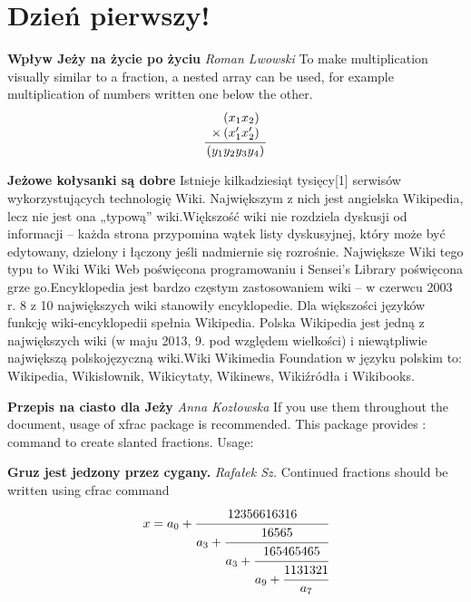 \documentclass{article}
\begin{document}
\section{Dzień pierwszy!}
                
\par \textbf{Wpływ Jeży na życie po życiu} \newline
\textit{Roman Lwowski} \newline
To make multiplication visually similar to a fraction, a nested array can be used, for example multiplication of numbers written one below the other.\begin{equation}\frac{    \begin{array}[b]{r}      \left( x_1 x_2 \right)\\      \times \left( x'_1 x'_2 \right)    \end{array}  }{    \left( y_1y_2y_3y_4 \right)  }\end{equation}\newline 
\par \textbf{Jeżowe kołysanki są dobre} \newline
\textit{ } \newline
Istnieje kilkadziesiąt tysięcy[1] serwisów wykorzystujących technologię Wiki. Największym z nich jest angielska Wikipedia, lecz nie jest ona „typową” wiki.Większość wiki nie rozdziela dyskusji od informacji – każda strona przypomina wątek listy dyskusyjnej, który może być edytowany, dzielony i łączony jeśli nadmiernie się rozrośnie. Największe Wiki tego typu to Wiki Wiki Web poświęcona programowaniu i Sensei’s Library poświęcona grze go.Encyklopedia jest bardzo częstym zastosowaniem wiki – w czerwcu 2003 r. 8 z 10 największych wiki stanowiły encyklopedie. Dla większości języków funkcję wiki-encyklopedii spełnia Wikipedia. Polska Wikipedia jest jedną z największych wiki (w maju 2013, 9. pod względem wielkości) i niewątpliwie największą polskojęzyczną wiki.Wiki Wikimedia Foundation w języku polskim to: Wikipedia, Wikisłownik, Wikicytaty, Wikinews, Wikiźródła i Wikibooks.\newline 
\par \textbf{Przepis na ciasto dla Jeży} \newline
\textit{Anna Kozłowska} \newline
If you use them throughout the document, usage of xfrac package is recommended. This package provides : command to create slanted fractions. Usage:\newline 
\par \textbf{Gruz jest jedzony przez cygany.} \newline
\textit{Rafałek Sz.} \newline
Continued fractions should be written using cfrac command\begin{equation}  x = a_0 + \cfrac{12356616316}{a_3           + \cfrac{16565}{a_3           + \cfrac{165465465}{a_9 + \cfrac{1131321}{a_7} } } }\end{equation}\newline 
\end{document}
